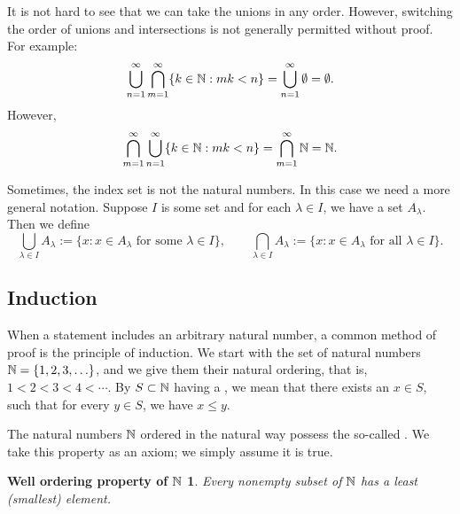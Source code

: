 It is not hard to see that we can take the unions in any order.  However,
switching the order of unions and intersections is not generally permitted without proof.
For example:
\begin{equation*}
\bigcup_{n=1}^\infty
\bigcap_{m=1}^\infty
\{ k \in {\mathbb{N}} : mk < n \}
=
\bigcup_{n=1}^\infty \emptyset = \emptyset .
\end{equation*}
However,
\begin{equation*}
\bigcap_{m=1}^\infty
\bigcup_{n=1}^\infty
\{ k \in {\mathbb{N}} : mk < n \}
=
\bigcap_{m=1}^\infty
{\mathbb{N}}
=
{\mathbb{N}}.
\end{equation*}

Sometimes, the index set is not the natural numbers.  In this case we need a
more general notation.  Suppose $I$ is some set and for each $\lambda \in
I$, we have a set $A_\lambda$.  Then we define
\begin{equation*}
\bigcup_{\lambda \in I} A_\lambda := \{ x : x \in A_\lambda \text{ for some }
\lambda \in I
\} ,
\qquad
\bigcap_{\lambda \in I} A_\lambda := \{ x : x \in A_\lambda \text{ for all }
\lambda \in I
\} .
\end{equation*}

\subsection{Induction}

When a statement includes an arbitrary natural number,
a common method of proof is the principle of induction.  
We start with the set of natural numbers ${\mathbb{N}} = \{ 1,2,3,\ldots \}$, and we
give them their natural ordering, 
that is, $1 < 2 < 3 < 4 < \cdots$.
By $S \subset {\mathbb{N}}$ having a \emph{}, we mean that
there exists an $x \in S$,
such that for every
$y \in S$, we have $x \leq y$.

The natural numbers ${\mathbb{N}}$ ordered in the natural way
possess the so-called \emph{}.
We take this property
as an axiom; we simply assume it is true.

\theoremstyle{plain}
\newtheorem*{wellordprop}{Well ordering property of ${\mathbb{N}}$}
\hypertarget{wop:link}{}%
\begin{wellordprop}
Every nonempty subset of ${\mathbb{N}}$ has a least (smallest) element.
\end{wellordprop}


